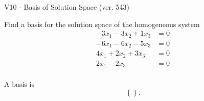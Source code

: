 \begin{exercise}
  \begin{exerciseTitle}V10 - Basis of Solution Space (ver. 543)\end{exerciseTitle}
  \begin{exerciseStatement}
    Find a basis for the solution space of the homogeneous system 
\begin{align*}
 -3 x_ 1 -3 x_ 2 + 1 x_ 3 &= 0  \\ 
  -6 x_ 1 -6 x_ 2 -5 x_ 3 &= 0  \\ 
  4 x_ 1 + 2 x_ 2 + 3 x_ 3 &= 0  \\ 
  2 x_ 1 -2 x_ 3 &= 0  \\ 
 \end{align*}


 
  \end{exerciseStatement}

  \begin{exerciseAnswer}
   A basis is   
\[\left\{\right\}.\]

  


  \end{exerciseAnswer}
\end{exercise}